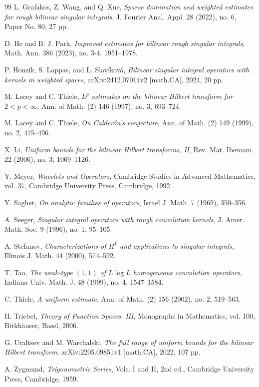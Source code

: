 \documentclass[11pt]{amsart}
\theoremstyle{remark}
\numberwithin{equation}{section}
\begin{document}
\begin{thebibliography}{99}
		L. Grafakos, Z. Wang, and Q. Xue,
		\emph{Sparse domination and weighted estimates for rough bilinear singular
			integrals},
		J. Fourier Anal. Appl. 28 (2022), no. 6, Paper No. 80, 27 pp.
		
		D. He and B. J. Park,
		\emph{Improved estimates for bilinear rough singular integrals},
		Math. Ann. 386 (2023), no. 3-4, 1951--1978.
		
		P. Honz\'ik, S. Lappas, and L. Slav\'ikov\'a,
		\emph{Bilinear singular integral operators with kernels in weighted spaces},
		arXiv:2412.07014v2 [math.CA], 2024, 20 pp.

		M. Lacey and C. Thiele,
		\emph{\(L^p\) estimates on the bilinear Hilbert transform for
			\(2<p<\infty\)},
		Ann. of Math. (2) 146 (1997), no. 3, 693--724.
		
		M. Lacey and C. Thiele,
		\emph{On Calder\'on's conjecture},
		Ann. of Math. (2) 149 (1999), no. 2, 475--496.
		
		X. Li,
		\emph{Uniform bounds for the bilinear Hilbert transforms, II},
		Rev. Mat. Iberoam. 22 (2006), no. 3, 1069--1126.
		
		Y. Meyer,
		\emph{Wavelets and Operators},
		Cambridge Studies in Advanced Mathematics, vol. 37, Cambridge University
		Press, Cambridge, 1992.
		
		Y. Sagher,
		\emph{On analytic families of operators},
		Israel J. Math. 7 (1969), 350--356.
		
		A. Seeger,
		\emph{Singular integral operators with rough convolution kernels},
		J. Amer. Math. Soc. 9 (1996), no. 1, 95--105.
		
		A. Stefanov,
		\emph{Characterizations of \(H^1\) and applications to singular integrals},
		Illinois J. Math. 44 (2000), 574--592.
		
		T. Tao,
		\emph{The weak-type \((1,1)\) of \(L\log L\) homogeneous convolution
			operators},
		Indiana Univ. Math. J. 48 (1999), no. 4, 1547--1584.
		
		C. Thiele,
		\emph{A uniform estimate},
		Ann. of Math. (2) 156 (2002), no. 2, 519--563.
		
		H. Triebel,
		\emph{Theory of Function Spaces. III},
		Monographs in Mathematics, vol. 100, Birkh\"auser, Basel, 2006.
		
		G. Uraltsev and M. Warchalski,
		\emph{The full range of uniform bounds for the bilinear Hilbert transform},
		arXiv:2205.09851v1 [math.CA], 2022, 107 pp.
		
		A. Zygmund,
		\emph{Trigonometric Series}, Vols. I and II, 2nd ed.,
		Cambridge University Press, Cambridge, 1959.
		
	\end{thebibliography}
	
	
\end{document}
